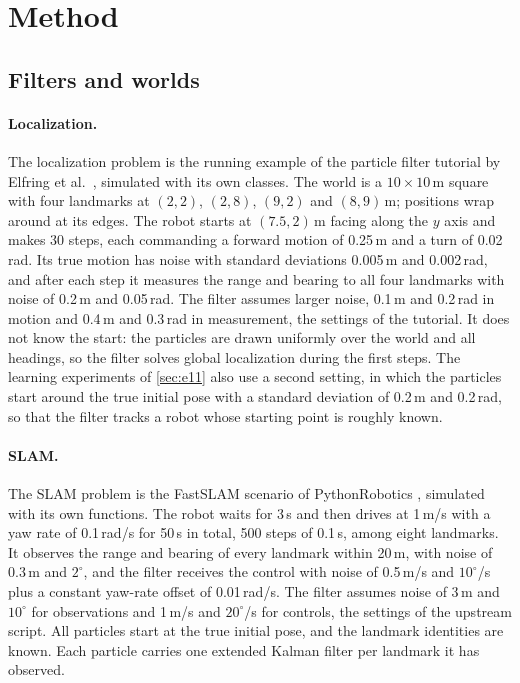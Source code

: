 \section{Method}\label{sec:method}

\subsection{Filters and worlds}

\paragraph{Localization.} The localization problem is the running example of the particle filter tutorial by Elfring
et al.\ \cite{elfring2021particle}, simulated with its own classes. The world is a $10 \times 10$\,m square with four
landmarks at $(2, 2)$, $(2, 8)$, $(9, 2)$ and $(8, 9)$\,m; positions wrap around at its edges. The robot starts at
$(7.5, 2)$\,m facing along the $y$ axis and makes 30 steps, each commanding a forward motion of 0.25\,m and a turn
of 0.02\,rad. Its true motion has noise with standard deviations 0.005\,m and 0.002\,rad, and after each step it
measures the range and bearing to all four landmarks with noise of 0.2\,m and 0.05\,rad. The filter assumes larger
noise, 0.1\,m and 0.2\,rad in motion and 0.4\,m and 0.3\,rad in measurement, the settings of the tutorial. It does
not know the start: the particles are drawn uniformly over the world and all headings, so the filter solves global
localization during the first steps. The learning experiments of \cref{sec:e11} also use a second setting, in which
the particles start around the true initial pose with a standard deviation of 0.2\,m and 0.2\,rad, so that the
filter tracks a robot whose starting point is roughly known.

\paragraph{SLAM.} The SLAM problem is the FastSLAM scenario of PythonRobotics \cite{sakai2018pythonrobotics},
simulated with its own functions. The robot waits for 3\,s and then drives at 1\,m/s with a yaw rate of 0.1\,rad/s for 50\,s in total, 500 steps of 0.1\,s,
among eight landmarks. It observes the range and bearing of every landmark within 20\,m, with noise of 0.3\,m and
$2^\circ$, and the filter receives the control with noise of 0.5\,m/s and $10^\circ$/s plus a constant yaw-rate
offset of 0.01\,rad/s. The filter assumes noise of 3\,m and $10^\circ$ for observations and 1\,m/s and $20^\circ$/s for
controls, the settings of the upstream script. All particles start at the true initial pose, and the landmark
identities are known. Each particle carries one extended Kalman filter per landmark it has observed.

